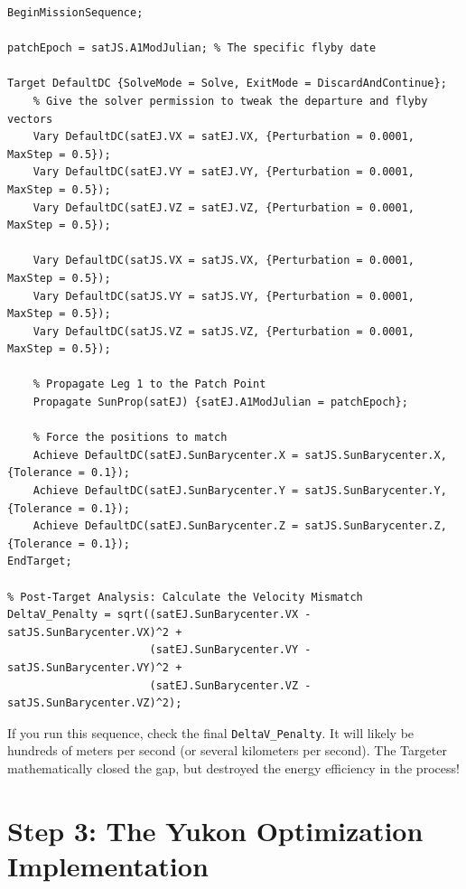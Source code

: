 \documentclass[11pt, letterpaper]{article}
\begin{document}
\begin{lstlisting}[caption=Mission Sequence: Targeter (DC)]
BeginMissionSequence;

patchEpoch = satJS.A1ModJulian; % The specific flyby date

Target DefaultDC {SolveMode = Solve, ExitMode = DiscardAndContinue};
    % Give the solver permission to tweak the departure and flyby vectors
    Vary DefaultDC(satEJ.VX = satEJ.VX, {Perturbation = 0.0001, MaxStep = 0.5});
    Vary DefaultDC(satEJ.VY = satEJ.VY, {Perturbation = 0.0001, MaxStep = 0.5});
    Vary DefaultDC(satEJ.VZ = satEJ.VZ, {Perturbation = 0.0001, MaxStep = 0.5});
    
    Vary DefaultDC(satJS.VX = satJS.VX, {Perturbation = 0.0001, MaxStep = 0.5});
    Vary DefaultDC(satJS.VY = satJS.VY, {Perturbation = 0.0001, MaxStep = 0.5});
    Vary DefaultDC(satJS.VZ = satJS.VZ, {Perturbation = 0.0001, MaxStep = 0.5});

    % Propagate Leg 1 to the Patch Point
    Propagate SunProp(satEJ) {satEJ.A1ModJulian = patchEpoch};

    % Force the positions to match
    Achieve DefaultDC(satEJ.SunBarycenter.X = satJS.SunBarycenter.X, {Tolerance = 0.1});
    Achieve DefaultDC(satEJ.SunBarycenter.Y = satJS.SunBarycenter.Y, {Tolerance = 0.1});
    Achieve DefaultDC(satEJ.SunBarycenter.Z = satJS.SunBarycenter.Z, {Tolerance = 0.1});
EndTarget;

% Post-Target Analysis: Calculate the Velocity Mismatch
DeltaV_Penalty = sqrt((satEJ.SunBarycenter.VX - satJS.SunBarycenter.VX)^2 + 
                      (satEJ.SunBarycenter.VY - satJS.SunBarycenter.VY)^2 + 
                      (satEJ.SunBarycenter.VZ - satJS.SunBarycenter.VZ)^2);
\end{lstlisting}

\begin{tcolorbox}[colback=red!5!white,colframe=red!75!black,title=Analysis Note]
If you run this sequence, check the final \texttt{DeltaV\_Penalty}. It will likely be hundreds of meters per second (or several kilometers per second). The Targeter mathematically closed the gap, but destroyed the energy efficiency in the process!
\end{tcolorbox}

\section*{Step 3: The Yukon Optimization Implementation}
\end{document}
